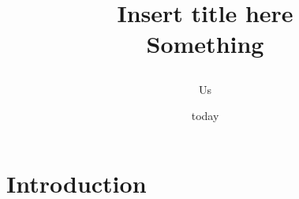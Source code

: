 \documentclass[12pt]{report}
\title{

	{Insert title here}\\
	{\large Something}


}
\author{Us}
\date{today}
\begin{document}
\maketitle

\chapter{Introduction}

\end{document}
